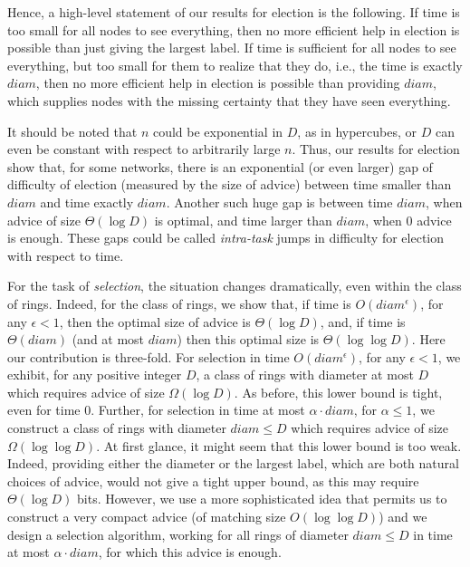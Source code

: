 \documentclass[11pt]{article}
\begin{document}
Hence, a high-level statement of our results for election is the following. If time is too small for all nodes to see everything, then no more efficient help in election is possible
than just giving the largest label. If time is sufficient for all nodes to see everything, but too small for them to realize that they do, i.e., the time is exactly $diam$, then no more efficient help in election is possible than providing $diam$, which supplies nodes with the missing certainty that they have seen everything.

It should be noted that $n$ could be exponential
in $D$, as in hypercubes, or $D$ can even be constant with respect to arbitrarily large  $n$. Thus, our results for election show that, for some networks, there is an exponential (or even
larger) gap of difficulty of election (measured by the size of advice) between time smaller than $diam$ and time exactly $diam$. Another such huge gap is between time
$diam$, when advice of size $\Theta(\log D)$ is optimal, and time larger than $diam$, when 0 advice is enough. These gaps could be called {\em intra-task}
jumps in difficulty for election with respect to time.  

 
 


For the task of {\em selection}, the situation changes dramatically,
even within the class of rings. Indeed, for the class of rings, we show that, if time is
$O(diam^{\epsilon})$, for any $\epsilon <1$, then the optimal size of advice is $\Theta(\log D)$, and, if time is $\Theta(diam)$ (and at most $diam$) then
 this optimal size is $\Theta(\log \log D)$. Here our contribution is three-fold. For selection in time $O(diam^{\epsilon})$, for any $\epsilon <1$,  we exhibit, for any
 positive integer $D$, a class of rings with diameter at most $D$ which requires advice of size $\Omega(\log D)$. As before, this lower bound is tight, even for time 0.
Further, for selection in time at most $\alpha \cdot diam$, for $\alpha \leq 1$, we construct a class of rings with diameter $diam \leq D$ which requires advice of size $\Omega(\log\log D)$. At first glance, it might seem that this lower bound is too weak. Indeed, providing  either the diameter or the largest label, which are both natural choices of advice, would not give a tight upper bound, as this may require $ \Theta(\log D)$ bits. However, we use a more sophisticated idea that permits us to construct a very compact advice 
(of matching size $O(\log\log D)$) and we design a selection algorithm,
working for all rings of diameter $diam \leq D$ in time at most $\alpha \cdot diam$, for which this advice is enough.   
 
\end{document}
